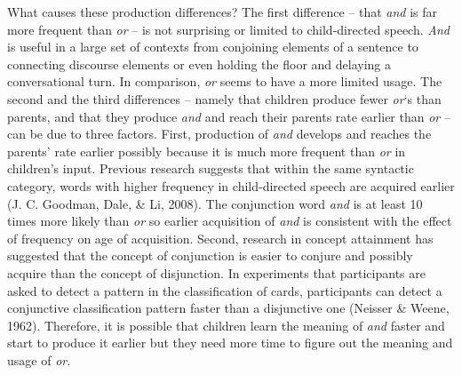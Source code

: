 \documentclass[oneside]{report}
\theoremstyle{definition}
\theoremstyle{definition}
\theoremstyle{definition}
\theoremstyle{remark}
\begin{document}
What causes these production differences? The first difference -- that
\emph{and} is far more frequent than \emph{or} -- is not surprising or
limited to child-directed speech. \emph{And} is useful in a large set of
contexts from conjoining elements of a sentence to connecting discourse
elements or even holding the floor and delaying a conversational turn.
In comparison, \emph{or} seems to have a more limited usage. The second
and the third differences -- namely that children produce fewer
\emph{or}`s than parents, and that they produce \emph{and} and reach
their parents rate earlier than \emph{or} -- can be due to three
factors. First, production of \emph{and} develops and reaches the
parents' rate earlier possibly because it is much more frequent than
\emph{or} in children's input. Previous research suggests that within
the same syntactic category, words with higher frequency in
child-directed speech are acquired earlier (J. C. Goodman, Dale, \& Li,
2008). The conjunction word \emph{and} is at least 10 times more likely
than \emph{or} so earlier acquisition of \emph{and} is consistent with
the effect of frequency on age of acquisition. Second, research in
concept attainment has suggested that the concept of conjunction is
easier to conjure and possibly acquire than the concept of disjunction.
In experiments that participants are asked to detect a pattern in the
classification of cards, participants can detect a conjunctive
classification pattern faster than a disjunctive one (Neisser \& Weene,
1962). Therefore, it is possible that children learn the meaning of
\emph{and} faster and start to produce it earlier but they need more
time to figure out the meaning and usage of \emph{or}.
\end{document}
